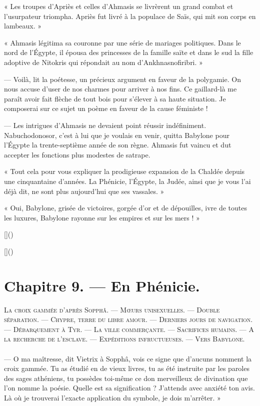 \documentclass[a4paper, 11pt, oneside, polutonikogreek, french]{article}
\begin{document}
« Les troupes d'Apriès et celles d'Ahmasis se livrèrent un grand combat et l'usurpateur triompha. Apriès fut livré à la populace de Saïs, qui mit son corps en lambeaux. »

« Ahmasis légitima sa couronne par une série de mariages politiques. Dans le nord de l'Égypte, il épousa des princesses de la famille saïte et dans le sud la fille adoptive de Nitokris qui répondait au nom d'Ankhnasnofiribri. »

--- Voilà, lit la poétesse, un précieux argument en faveur de la polygamie. On nous accuse d'user de nos charmes pour arriver à nos fins. Ce gaillard-là me paraît avoir fait flèche de tout bois pour s'élever à sa haute situation. Je composerai sur ce sujet un poème en faveur de la cause féministe !

--- Les intrigues d'Ahmasis ne devaient point réussir indéfiniment. Nabuchodonosor, c'est à lui que je voulais en venir, quitta Babylone pour l'Égypte la trente-septième année de son règne. Ahmasis fut vaincu et dut accepter les fonctions plus modestes de satrape.

« Tout cela pour vous expliquer la prodigieuse expansion de la Chaldée depuis une cinquantaine d'années. La Phénicie, l'Égypte, la Judée, ainsi que je vous l'ai déjà dit, ne sont plus aujourd'hui que ses vassales. »

« Oui, Babylone, grisée de victoires, gorgée d'or et de dépouilles, ivre de toutes les luxures, Babylone rayonne sur les empires et sur les mers ! »

[]()

[]()
\clearpage
\section{Chapitre 9. --- En Phénicie.}
\begin{center}
\scshape
\small
La croix gammée d'après Sopphâ. --- Mœurs unisexuelles. --- Double séparation. --- Chypre, terre du libre amour. --- Derniers jours de navigation. --- Débarquement à Tyr. --- La ville commerçante. --- Sacrifices humains. --- A la recherche de l'esclave. --- Expéditions infructueuses. --- Vers Babylone.
\end{center}
\paragraph{}
--- O ma maîtresse, dit Vietrix à Sopphâ, vois ce signe que d'aucuns nomment la croix gammée. Tu as étudié en de vieux livres, tu as été instruite par les paroles des sages athéniens, tu possèdes toi-même ce don merveilleux de divination que l'on nomme la poésie. Quelle est sa signification ? J'attends avec anxiété ton avis. Là où je trouverai l'exacte application du symbole, je dois m'arrêter. »
\end{document}
